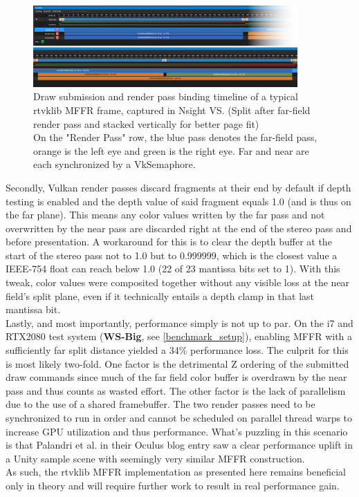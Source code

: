 \begin{figure}[htb]
  \centering
  \includegraphics[width=0.9\textwidth]{pictures/MFFR_timeline_stacked_delimited}
  \caption{Draw submission and render pass binding timeline of a typical \gls{rtvklib} \gls{MFFR} frame, captured in \gls{Nsight VS}. (Split after far-field render pass and stacked vertically for better page fit) \\On the "Render Pass" row, the blue pass denotes the far-field pass, orange is the left eye and green is the right eye. Far and near are each synchronized by a VkSemaphore.} \label{fig:Nsight_MFFR}
\end{figure}

Secondly, Vulkan render passes discard fragments at their end by default if depth testing is enabled and the depth value of said fragment equals 1.0 (and is thus on the far plane). This means any color values written by the far pass and not overwritten by the near pass are discarded right at the end of the stereo pass and before presentation. A workaround for this is to clear the depth buffer at the start of the stereo pass not to 1.0 but to 0.999999, which is the closest value a IEEE-754 float can reach below 1.0 (22 of 23 mantissa bits set to 1). With this tweak, color values were composited together without any visible loss at the near field's split plane, even if it technically entails a depth clamp in that last mantissa bit. \\
Lastly, and most importantly, performance simply is not up to par. On the i7 and RTX2080 test system (\textbf{WS-Big}, see \autoref{benchmark_setup}), enabling \gls{MFFR} with a sufficiently far split distance yielded a 34\% performance loss. The culprit for this is most likely two-fold. One factor is the detrimental Z ordering of the submitted draw commands since much of the far field color buffer is overdrawn by the near pass and thus counts as wasted effort. The other factor is the lack of parallelism due to the use of a shared framebuffer. The two render passes need to be synchronized to run in order and cannot be scheduled on parallel thread warps to increase GPU utilization and thus performance. What's puzzling in this scenario is that Palandri et al. in their Oculus blog entry\cite{Palandri.2016} saw a clear performance uplift in a Unity sample scene with seemingly very similar \gls{MFFR} construction. \\
As such, the \gls{rtvklib} \gls{MFFR} implementation as presented here remains beneficial only in theory and will require further work to result in real performance gain. 

